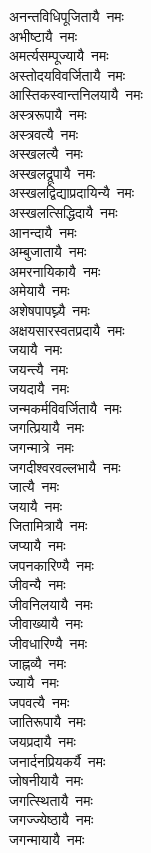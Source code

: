 \begin{flushleft}
\begin{multicols}{2}
अनन्तविधिपूजितायै~नमः\hfill{}\\
अभीष्टायै~नमः\\
अमर्त्यसम्पूज्यायै~नमः\\
अस्तोदयविवर्जितायै~नमः\\
आस्तिकस्वान्तनिलयायै~नमः\\
अस्त्ररूपायै~नमः\\
अस्त्रवत्यै~नमः\\
अस्खलत्यै~नमः\\
अस्खलद्रूपायै~नमः\\
अस्खलद्विद्याप्रदायिन्यै~नमः\\
अस्खलत्सिद्धिदायै~नमः\hfill{}\\
आनन्दायै~नमः\\
अम्बुजातायै~नमः\\
अमरनायिकायै~नमः\\
अमेयायै~नमः\\
अशेषपापघ्न्यै~नमः\\
अक्षयसारस्वतप्रदायै~नमः\\
जयायै~नमः\\
जयन्त्यै~नमः\\
जयदायै~नमः\\
जन्मकर्मविवर्जितायै~नमः\hfill{}\\
जगत्प्रियायै~नमः\\
जगन्मात्रे~नमः\\
जगदीश्वरवल्लभायै~नमः\\
जात्यै~नमः\\
जयायै~नमः\\
जितामित्रायै~नमः\\
जप्यायै~नमः\\
जपनकारिण्यै~नमः\\
जीवन्यै~नमः\\
जीवनिलयायै~नमः\hfill{}\\
जीवाख्यायै~नमः\\
जीवधारिण्यै~नमः\\
जाह्नव्यै~नमः\\
ज्यायै~नमः\\
जपवत्यै~नमः\\
जातिरूपायै~नमः\\
जयप्रदायै~नमः\\
जनार्दनप्रियकर्यै~नमः\\
जोषनीयायै~नमः\\
जगत्स्थितायै~नमः\hfill{}\\
जगज्ज्येष्ठायै~नमः\\
जगन्मायायै~नमः\\

\end{multicols}
\end{flushleft}
